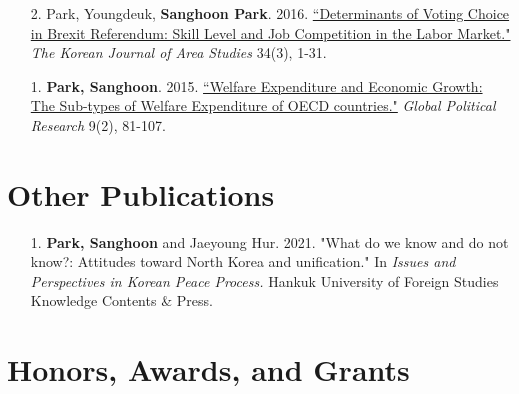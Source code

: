 \documentclass[margin,line]{res}
\begin{document}
\begin{resume}
\begin{enumerate}[leftmargin=*]
\item[2.] Park, Youngdeuk, \textbf{Sanghoon Park}. 2016. \href{http://kiss.kstudy.com/thesis/thesis-view.asp?key=3472800}{``Determinants of Voting Choice in Brexit Referendum: Skill Level and Job Competition in the Labor Market."} \textit{The Korean Journal of Area Studies} 34(3), 1-31.	
\item[1.] \textbf{Park, Sanghoon}. 2015. \href{http://search.koreanstudies.net/thesis/thesis-view.asp?key=3438155}{``Welfare Expenditure and Economic Growth: The Sub-types of Welfare Expenditure of OECD countries."} \textit{Global Political Research} 9(2), 81-107.	
\end{enumerate}
\newpage

\section{\sc Other Publications}
\begin{enumerate}[leftmargin=*]
	\item[1.] \textbf{Park, Sanghoon} and Jaeyoung Hur. 2021. "What do we know and do not know?: Attitudes toward North Korea and unification." In {\it Issues and Perspectives in Korean Peace Process.} Hankuk University of Foreign Studies Knowledge Contents \& Press.
\end{enumerate}


\section{\sc Honors, Awards, and Grants} 


\end{resume}
\end{document}
